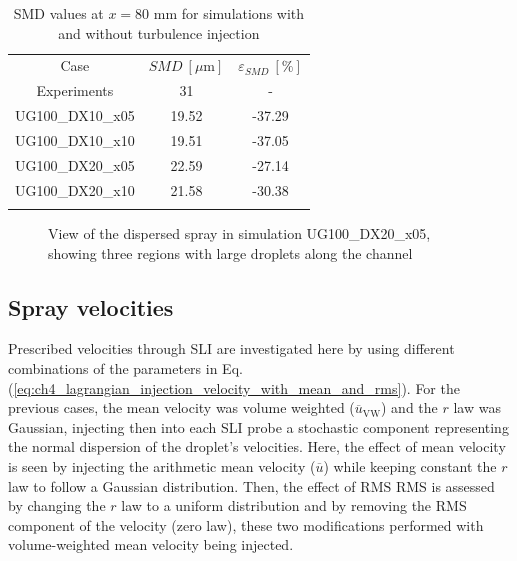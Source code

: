 \begin{table}[!h]
\centering
\caption{SMD values at $x = 80$ mm for simulations with and without turbulence injection}
\begin{tabular}{ccc}
\thickhline
Case & $SMD~\left[\mu \mathrm{m} \right]$ & $\varepsilon_{SMD}~\left[\% \right]$ \\
\thickhline
Experiments & 31 & - \\
UG100\_DX10\_x05 & 19.52 & -37.29 \\
UG100\_DX10\_x10 & 19.51 & -37.05 \\
UG100\_DX20\_x05 & 22.59 & -27.14 \\
UG100\_DX20\_x10 & 21.58 & -30.38 \\
\thickhline
\end{tabular}
\label{tab:SMD_deviations_turb_inj}
\end{table}

\begin{figure}[h!]
	\centering	{}
	\caption{View of the dispersed spray in simulation UG100\_DX20\_x05, showing three regions with large droplets along the channel}
	\label{fig:JICF_dx20_large_droplets}
\end{figure}

\subsection{Spray velocities}
\label{subsec:SLI_LGS_velocity_effects}

Prescribed velocities through SLI are investigated here by using different combinations of the parameters in Eq. (\ref{eq:ch4_lagrangian_injection_velocity_with_mean_and_rms}). For the previous cases, the mean velocity was volume weighted ($\overline{u}_\mathrm{VW}$) and the $r$ law was Gaussian, injecting then into each SLI probe a stochastic component representing the normal dispersion of the droplet's velocities. Here, the effect of mean velocity is seen by injecting the arithmetic mean velocity ($\overline{u}$) while keeping constant the $r$ law to follow a Gaussian distribution. Then, the effect of $\mathrm{RMS}$ RMS is assessed by changing the $r$ law to a uniform distribution and by removing the RMS component of the velocity (zero law), these two modifications performed with volume-weighted mean velocity being injected.

